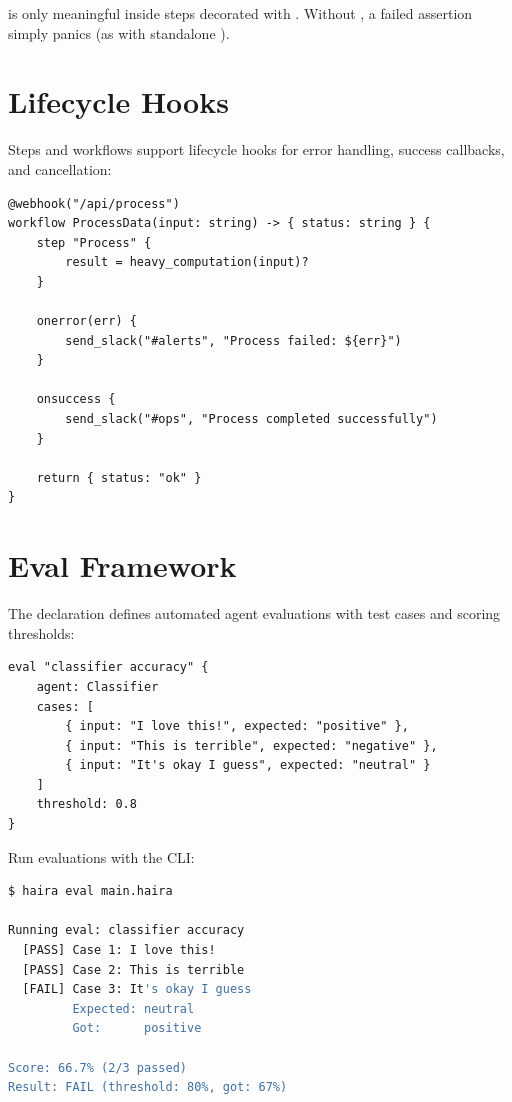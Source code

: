 \begin{note}
 is only meaningful inside steps decorated with . Without , a failed assertion simply panics (as with standalone ).
\end{note}

\section{Lifecycle Hooks}

Steps and workflows support lifecycle hooks for error handling, success callbacks, and cancellation:

\begin{lstlisting}
@webhook("/api/process")
workflow ProcessData(input: string) -> { status: string } {
    step "Process" {
        result = heavy_computation(input)?
    }

    onerror(err) {
        send_slack("#alerts", "Process failed: ${err}")
    }

    onsuccess {
        send_slack("#ops", "Process completed successfully")
    }

    return { status: "ok" }
}
\end{lstlisting}

\section{Eval Framework}

The  declaration defines automated agent evaluations with test cases and scoring thresholds:

\begin{lstlisting}
eval "classifier accuracy" {
    agent: Classifier
    cases: [
        { input: "I love this!", expected: "positive" },
        { input: "This is terrible", expected: "negative" },
        { input: "It's okay I guess", expected: "neutral" }
    ]
    threshold: 0.8
}
\end{lstlisting}

Run evaluations with the CLI:

\begin{lstlisting}[language=bash,numbers=none]
$ haira eval main.haira

Running eval: classifier accuracy
  [PASS] Case 1: I love this!
  [PASS] Case 2: This is terrible
  [FAIL] Case 3: It's okay I guess
         Expected: neutral
         Got:      positive

Score: 66.7% (2/3 passed)
Result: FAIL (threshold: 80%, got: 67%)
\end{lstlisting}

